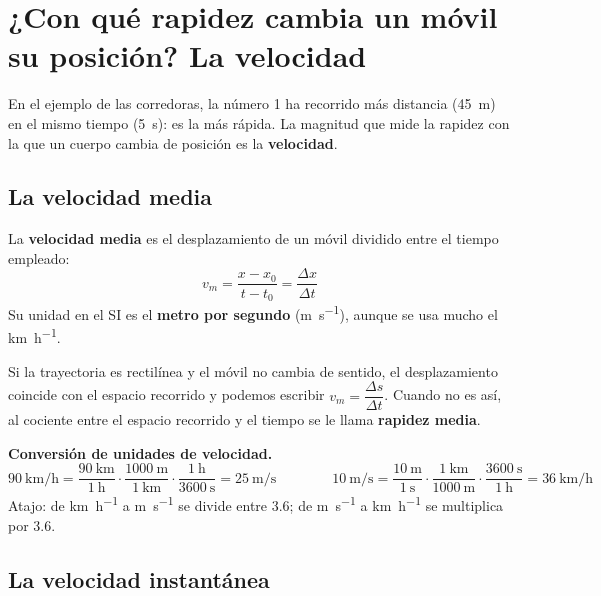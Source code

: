 \section{¿Con qué rapidez cambia un móvil su posición? La velocidad}

En el ejemplo de las corredoras, la número 1 ha recorrido más distancia (\qty{45}{\m}) en el mismo tiempo (\qty{5}{\s}): es la más rápida. La magnitud que mide la rapidez con la que un cuerpo cambia de posición es la \textbf{velocidad}.

\subsection{La velocidad media}

\begin{definition}
    La \textbf{velocidad media} es el desplazamiento de un móvil dividido entre el tiempo empleado:
    \[ v_m = \frac{x - x_0}{t - t_0} = \frac{\Delta x}{\Delta t} \]
    Su unidad en el SI es el \textbf{metro por segundo} (\unit{\m\per\s}), aunque se usa mucho el \unit{\km\per\hour}.
\end{definition}

Si la trayectoria es rectilínea y el móvil no cambia de sentido, el desplazamiento coincide con el espacio recorrido y podemos escribir \(v_m = \dfrac{\Delta s}{\Delta t}\). Cuando no es así, al cociente entre el espacio recorrido y el tiempo se le llama \textbf{rapidez media}.

\begin{marker}
    \textbf{Conversión de unidades de velocidad.}
    \[ \qty{90}{\km\per\hour} = \frac{\qty{90}{\km}}{\qty{1}{\hour}} \cdot \frac{\qty{1000}{\m}}{\qty{1}{\km}} \cdot \frac{\qty{1}{\hour}}{\qty{3600}{\s}} = \qty{25}{\m\per\s} \qquad\qquad \qty{10}{\m\per\s} = \frac{\qty{10}{\m}}{\qty{1}{\s}} \cdot \frac{\qty{1}{\km}}{\qty{1000}{\m}} \cdot \frac{\qty{3600}{\s}}{\qty{1}{\hour}} = \qty{36}{\km\per\hour} \]
    Atajo: de \unit{\km\per\hour} a \unit{\m\per\s} se divide entre \num{3.6}; de \unit{\m\per\s} a \unit{\km\per\hour} se multiplica por \num{3.6}.
\end{marker}

\subsection{La velocidad instantánea}

